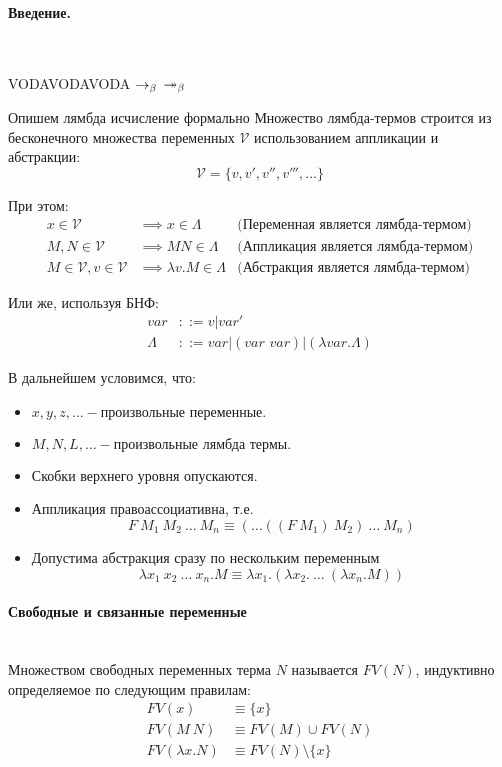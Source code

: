 \documentclass[lambda.tex]{subfiles}
\begin{document}
\paragraph{Введение.} ~\\

\begin{tcolorbox}
VODAVODAVODA
$\rightarrow_\beta$
$\twoheadrightarrow_\beta$
\end{tcolorbox}

Опишем лямбда исчисление формально
Множество лямбда-термов строится из бесконечного множества переменных $\mathcal{V}$ использованием аппликации и абстракции:
\[\mathcal{V} = \{ v, v', v'', v''', ... \}\]

При этом:
\begin{align*}
x \in \mathcal{V} & \implies x \in \Lambda & \text{(Переменная является лямбда-термом)}\\
M, N \in \mathcal{V} & \implies M N \in \Lambda & \text{(Аппликация является лямбда-термом)}\\
M \in \mathcal{V}, v \in \mathcal{V} & \implies \lambda v.M \in \Lambda & \text{(Абстракция является лямбда-термом)}
\end{align*}

Или же, используя БНФ:
\begin{align*}
var &::= v|var'\\
\Lambda &::= var | (\textit{var var}) | ( \lambda var . \Lambda )
\end{align*}

В дальнейшем условимся, что:
\begin{itemize}
\item\(x,y,z,\dots - \text{произвольные переменные.}\)
\item\(M,N,L,\dots - \text{произвольные лямбда термы.}\)
\item Скобки верхнего уровня опускаются.
\item Аппликация правоассоциативна, т.е.\\
\[F\ M_1 \ M_2 \ \dots\ M_n \equiv (\dots((F\ M_1)\ M_2)\ \dots\ M_n)\]
\item Допустима абстракция сразу по нескольким переменным
\[\lambda x_1 \ x_2 \ \dots\ x_n .M \equiv \lambda x_1 .(\lambda x_2 .\ \dots\ (\lambda x_n .M))\]
\end{itemize}

\paragraph{Свободные и связанные переменные} %
\label{par:free_and_bound} ~\\
Множеством свободных переменных терма $N$ называется $FV(N)$, индуктивно определяемое по следующим правилам:
\begin{align*}
FV(x) &\equiv \{x\}\\
FV(M\ N) &\equiv FV(M)\cup FV(N)\\
FV(\lambda x.N) &\equiv FV(N)\setminus\{x\}
\end{align*}
\end{document}
